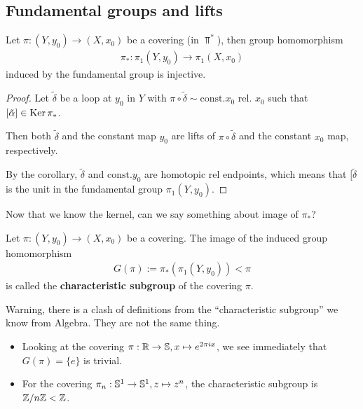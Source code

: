 \subsection{Fundamental groups and lifts}
\begin{cor}[]\label{cor:cor2}
  Let $\pi:(Y,y_0) \to (X,x_0)$ be a covering (in $\Top^{\ast}$), then group homomorphism 
  \begin{align*}
    \pi_{\ast}: \pi_1(Y,y_0) \to \pi_1(X,x_0)
  \end{align*}
  induced by the fundamental group is injective.
\end{cor}
\begin{proof}
  Let $\tilde{\delta}$ be a loop at $y_0$ in $Y$ with $\pi \circ \tilde{\delta} \sim \text{const.} x_0$ rel. $x_0$ such that $[\tilde{\alpha}] \in \operatorname{Ker} \pi_{\ast}$.

  Then both $\tilde{\delta}$ and the constant map $y_0$ are lifts of $\pi \circ \tilde{\delta}$ and the constant $x_0$ map, respectively.

  By the corollary, $\tilde{\delta}$ and $\text{const.} y_0$ are homotopic rel endpoints, which means that $[\tilde{\delta}$ is the unit in the fundamental group $\pi_1(Y,y_0)$.
\end{proof}

Now that we know the kernel, can we say something about image of $\pi_{\ast}$?
\begin{dfn}[]
  Let $\pi:(Y,y_0) \to  (X,x_0)$ be a covering. The image of the induced group homomorphism
  \begin{align*}
    G(\pi) := \pi_{\ast}(\pi_1(Y,y_0)) < \pi
  \end{align*}
  is called the \textbf{characteristic subgroup} of the covering $\pi$.
\end{dfn}
Warning, there is a clash of definitions from the ``characteristic subgroup'' we know from Algebra. They are not the same thing.

\begin{ex}[]
  \begin{itemize}
    \item Looking at the covering $\pi: \mathbb{R} \to \mathbb{S}, x \mapsto  e^{2 \pi i x}$, we see immediately that $G(\pi) = \{e\}$ is trivial.
    \item For the covering $\pi_n: \mathbb{S}^{1} \to \mathbb{S}^{1}, z \mapsto  z^{n}$, the characteristic subgroup is $\mathbb{Z}/n\mathbb{Z} < \mathbb{Z}$.
  \end{itemize}
\end{ex}

